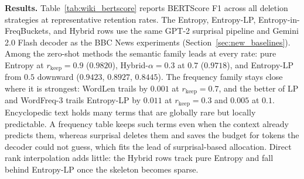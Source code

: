 \documentclass[11pt]{article}
\newcommand{\rkeep}{r_{\mathrm{keep}}}
\begin{document}
\textbf{Results.}
Table~\ref{tab:wiki_bertscore} reports BERTScore F1 across all deletion strategies
at representative retention rates.
The Entropy, Entropy-LP, Entropy-in-FreqBuckets, and Hybrid rows use the same
GPT-2 surprisal pipeline and Gemini 2.0 Flash decoder as the BBC News experiments
(Section~\ref{sec:new_baselines}).
Among the zero-shot methods the semantic family leads at every rate: pure Entropy at
$\rkeep = 0.9$ ($0.9820$), Hybrid-$\alpha{=}0.3$ at $0.7$ ($0.9718$), and Entropy-LP from $0.5$
downward ($0.9423$, $0.8927$, $0.8445$). The frequency family stays close where it is strongest:
WordLen trails by $0.001$ at $\rkeep = 0.7$, and the better of LP and WordFreq-3 trails Entropy-LP by
$0.011$ at $\rkeep = 0.3$ and $0.005$ at $0.1$. Encyclopedic text holds many terms that are globally rare
but locally predictable. A frequency table keeps such terms even when the context already predicts
them, whereas surprisal deletes them and saves the budget for tokens the decoder could not guess,
which fits the lead of surprisal-based allocation. Direct rank interpolation adds little: the
Hybrid rows track pure Entropy and fall behind Entropy-LP once the skeleton becomes sparse.
\end{document}
